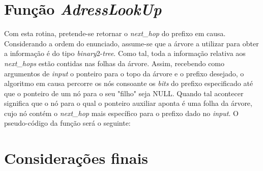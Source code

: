 \documentclass[twocolumn]{article}
\begin{document}
\section{Função \textit{AdressLookUp}}
Com esta rotina, pretende-se retornar o \textit{next\_hop} do prefixo em causa. Considerando a ordem do enunciado, assume-se que a árvore a utilizar para obter a informação é do tipo \textit{binary}2-\textit{tree}. Como tal, toda a informação relativa aos \textit{next\_hops} estão contidas nas folhas da árvore. Assim, recebendo como argumentos de \textit{input} o ponteiro para o topo da árvore e o prefixo desejado, o algoritmo em causa percorre os nós consoante os \textit{bits} do prefixo especificado até que o ponteiro de um nó para o seu "filho" seja NULL. Quando tal acontecer significa que o nó para o qual o ponteiro auxiliar aponta é uma folha da árvore, cujo nó contém o \textit{next\_hop} mais específico para o prefixo dado no \textit{input}.
O pseudo-código da função será o seguinte:
\begin{algorithmic}
 	\Return $-1\;$
 \EndIf
 
 \State $auxiliar:=root\;$
 
 		\If{$has\_no\_"0"\_child$}{
 			\Return $auxiliar->next\_hop\;$
 		\EndIf
 		\State $auxiliar:=auxiliar->zero\;$
 	\Else
 		\If{$has\_no\_"1"\_child$}
 			\Return $auxiliar->next\_hop\;$
 		\EndIf
 		\State $auxiliar:=auxiliar->one\;$
 	\EndIf
 \EndWhile
 
 \Return -1\;
 \caption{AdressLookUp}
\end{algorithmic}
\section{Considerações finais}
\end{document}
